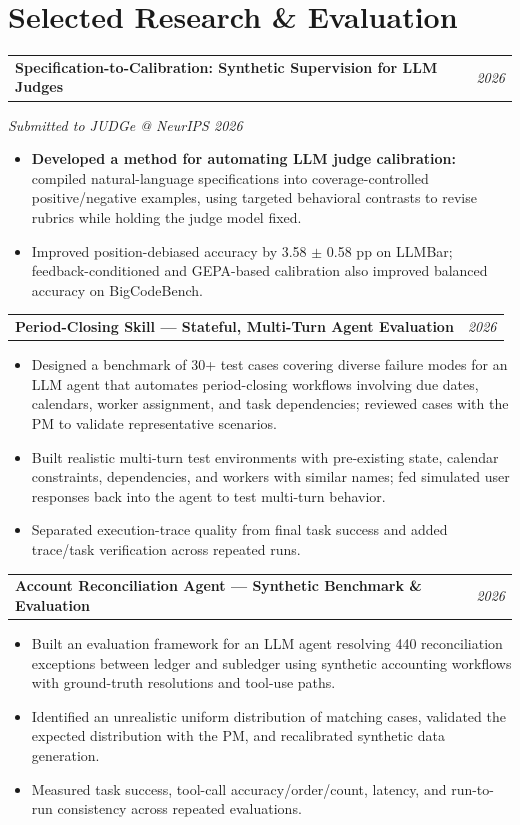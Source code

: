 \documentclass[10pt,letterpaper]{article}
\makeatletter
\newcommand{\researchHeading}[2]{%
\vspace{5pt}
\begin{tabularx}{\textwidth}{@{}Xr@{}}
\textbf{#1} & \textit{#2}
\end{tabularx}
\vspace{-10pt}}
\makeatother
\begin{document}
\section*{Selected Research \& Evaluation}

\researchHeading{Specification-to-Calibration: Synthetic Supervision for LLM Judges}{2026}
\textit{Submitted to JUDGe @ NeurIPS 2026}
\vspace{10pt}
\begin{itemize}
\item \textbf{Developed a method for automating LLM judge calibration:} compiled natural-language specifications into coverage-controlled positive/negative examples, using targeted behavioral contrasts to revise rubrics while holding the judge model fixed.
\item Improved position-debiased accuracy by 3.58 $\pm$ 0.58 pp on LLMBar; feedback-conditioned and GEPA-based calibration also improved balanced accuracy on BigCodeBench.
\end{itemize}

\researchHeading{Period-Closing Skill --- Stateful, Multi-Turn Agent Evaluation}{2026}
\vspace{-5pt}
\begin{itemize}
\item Designed a benchmark of 30+ test cases covering diverse failure modes for an LLM agent that automates period-closing workflows involving due dates, calendars, worker assignment, and task dependencies; reviewed cases with the PM to validate representative scenarios.
\item Built realistic multi-turn test environments with pre-existing state, calendar constraints, dependencies, and workers with similar names; fed simulated user responses back into the agent to test multi-turn behavior.
\item Separated execution-trace quality from final task success and added trace/task verification across repeated runs.
\end{itemize}

\researchHeading{Account Reconciliation Agent --- Synthetic Benchmark \& Evaluation}{2026}
\vspace{-5pt}
\begin{itemize}
\item Built an evaluation framework for an LLM agent resolving 440 reconciliation exceptions between ledger and subledger using synthetic accounting workflows with ground-truth resolutions and tool-use paths.
\item Identified an unrealistic uniform distribution of matching cases, validated the expected distribution with the PM, and recalibrated synthetic data generation.
\item Measured task success, tool-call accuracy/order/count, latency, and run-to-run consistency across repeated evaluations.
\end{itemize}
\end{document}
